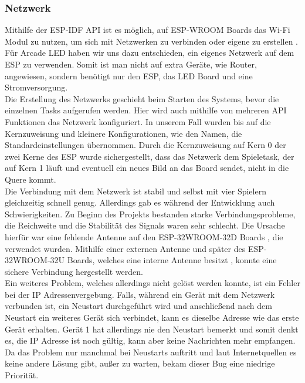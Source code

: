 \documentclass[12pt,a4paper]{article}
\begin{document}
\subsubsection{Netzwerk}
Mithilfe der ESP-IDF API ist es möglich, auf ESP-WROOM Boards das Wi-Fi Modul zu nutzen, um sich mit Netzwerken zu verbinden oder eigene zu erstellen \cite{ESSPRESSIF:Reference}. Für Arcade LED haben wir uns dazu entschieden, ein eigenes Netzwerk auf dem ESP zu verwenden. Somit ist man nicht auf extra Geräte, wie Router, angewiesen, sondern benötigt nur den ESP, das LED Board und eine Stromversorgung.
\vspace{1ex}\\
Die Erstellung des Netzwerks geschieht beim Starten des Systems, bevor die einzelnen Tasks aufgerufen werden. Hier wird auch mithilfe von mehreren API Funktionen das Netzwerk konfiguriert. In unserem Fall wurden bis auf die Kernzuweisung und kleinere Konfigurationen, wie den Namen, die Standardeinstellungen übernommen. Durch die Kernzuweisung auf Kern 0 der zwei Kerne des ESP wurde sichergestellt, dass das Netzwerk dem Spieletask, der auf Kern 1 läuft und eventuell ein neues Bild an das Board sendet, nicht in die Quere kommt.
\vspace{1ex}\\
Die Verbindung mit dem Netzwerk ist stabil und selbst mit vier Spielern gleichzeitig schnell genug. Allerdings gab es während der Entwicklung auch Schwierigkeiten. Zu Beginn des Projekts bestanden starke Verbindungsprobleme, die Reichweite und die Stabilität des Signals waren sehr schlecht. Die Ursache hierfür war eine fehlende Antenne auf den ESP-32WROOM-32D Boards \cite{ESP:Datasheet}, die verwendet wurden. Mithilfe einer externen Antenne und später des ESP-32WROOM-32U Boards, welches eine interne Antenne besitzt \cite{ESP:Datasheet}, konnte eine sichere Verbindung hergestellt werden.
\vspace{1ex}\\
Ein weiteres Problem, welches allerdings nicht gelöst werden konnte, ist ein Fehler bei der IP Adressenvergebung. Falls, während ein Gerät mit dem Netzwerk verbunden ist, ein Neustart durchgeführt wird und anschließend nach dem Neustart ein weiteres Gerät sich verbindet, kann es dieselbe Adresse wie das erste Gerät erhalten. Gerät 1 hat allerdings nie den Neustart bemerkt und somit denkt es, die IP Adresse ist noch gültig, kann aber keine Nachrichten mehr empfangen. Da das Problem nur manchmal bei Neustarts auftritt und laut Internetquellen es keine andere Lösung gibt, außer zu warten, bekam dieser Bug eine niedrige Priorität.
\end{document}
